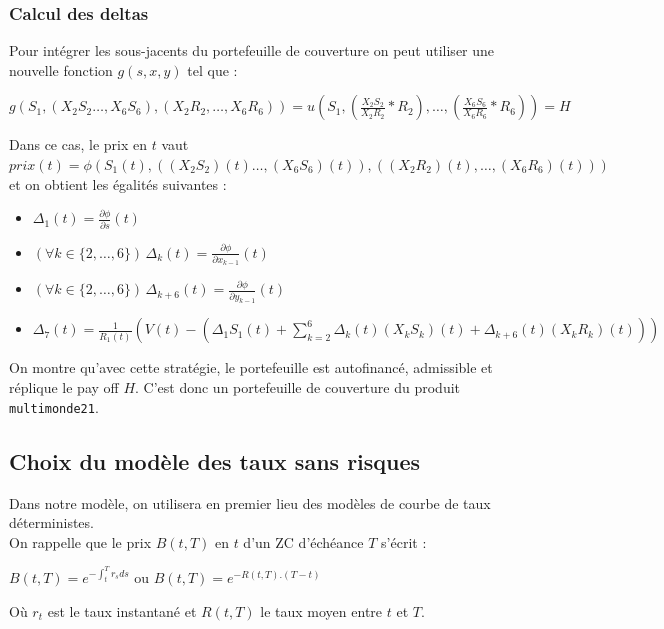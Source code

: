 \documentclass[a4paper,12pt]{article}
\begin{document}
\subsubsection{Calcul des deltas}
Pour intégrer les sous-jacents du portefeuille de couverture on peut utiliser une nouvelle fonction $g(s,x,y)$ tel que :
\begin{center}
$g\left(S_1,\left(X_2S_2\ldots,X_6S_6\right),\left(X_2R_2,\ldots,X_6R_6\right)\right) = u\left(S_1,\left(\frac{X_2S_2}{X_2R_2}*R_2\right),\ldots,\left(\frac{X_6S_6}{X_6R_6}*R_6\right)\right) = H$
\end{center}
Dans ce cas, le prix en $t$ vaut $prix(t)=\phi\left(S_1(t),\left((X_2S_2)(t)\ldots,(X_6S_6)(t)\right),\left((X_2R_2)(t),\ldots,(X_6R_6)(t)\right)\right)$ et on obtient les égalités suivantes : \\
\begin{itemize}[label=$\bullet$]
\item $\Delta_1(t)=\frac{\partial\phi}{\partial s}(t)$ \\
\item $\left(\forall k\in\{2,\ldots,6\}\right)\,\Delta_k(t)=\frac{\partial\phi}{\partial x_{k-1}}(t)$ \\
\item $\left(\forall k\in\{2,\ldots,6\}\right)\,\Delta_{k+6}(t)=\frac{\partial\phi}{\partial y_{k-1}}(t)$ \\
\item $\Delta_7(t)=\frac{1}{R_1(t)}\left(V(t)-\left(\Delta_1S_1(t)+\sum\limits_{k=2}^6\Delta_k(t)(X_kS_k)(t)+\Delta_{k+6}(t)(X_kR_k)(t)\right)\right)$
\end{itemize} \vspace*{3mm}
On montre qu'avec cette stratégie, le portefeuille est autofinancé, admissible et réplique le pay off $H$. C'est donc un portefeuille de couverture du produit {\tt multimonde21}.
\newpage
\subsection{Choix du modèle des taux sans risques}
Dans notre modèle, on utilisera en premier lieu des modèles de courbe de taux déterministes. \\
On rappelle que le prix $B(t,T)$ en $t$ d'un ZC d'échéance $T$ s'écrit : 
\begin{center}
$B(t,T) = e^{-\int_t^Tr_sds}$ ou $B(t,T) = e^{-R(t,T).(T-t)}$
\end{center}
Où $r_t$ est le taux instantané et $R(t,T)$ le taux moyen entre $t$ et $T$. \\
\end{document}
